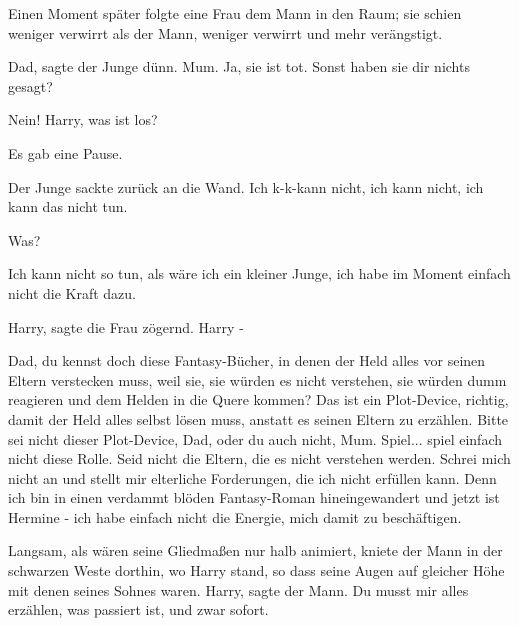 Einen Moment später folgte eine Frau dem Mann in den Raum; sie schien weniger
verwirrt als der Mann, weniger verwirrt und mehr verängstigt.

\glqq Dad\grqq{}, sagte der Junge dünn. \glqq Mum. Ja, sie ist tot. Sonst haben
sie dir nichts gesagt?\grqq{}

\glqq Nein! Harry, was ist los?\grqq{}

Es gab eine Pause.

Der Junge sackte zurück an die Wand. \glqq Ich k-k-kann nicht, ich kann nicht,
ich kann das nicht tun.\grqq{}

\glqq Was?\grqq{}

\glqq Ich kann nicht so tun, als wäre ich ein kleiner Junge, ich habe im Moment
einfach nicht die Kraft dazu.\grqq{}

\glqq Harry\grqq{}, sagte die Frau zögernd. \glqq Harry -\grqq{}

\glqq Dad, du kennst doch diese Fantasy-Bücher, in denen der Held alles vor
seinen Eltern verstecken muss, weil sie, sie würden es nicht verstehen, sie
würden dumm reagieren und dem Helden in die Quere kommen? Das ist ein
Plot-Device, richtig, damit der Held alles selbst lösen muss, anstatt es seinen
Eltern zu erzählen. Bitte sei nicht dieser Plot-Device, Dad, oder du auch nicht,
Mum. Spiel... spiel einfach nicht diese Rolle. Seid nicht die Eltern, die es
nicht verstehen werden. Schrei mich nicht an und stellt mir elterliche
Forderungen, die ich nicht erfüllen kann. Denn ich bin in einen verdammt blöden
Fantasy-Roman hineingewandert und jetzt ist Hermine - ich habe einfach nicht die
Energie, mich damit zu beschäftigen.\grqq{}

Langsam, als wären seine Gliedmaßen nur halb animiert, kniete der Mann in der
schwarzen Weste dorthin, wo Harry stand, so dass seine Augen auf gleicher Höhe
mit denen seines Sohnes waren. \glqq Harry\grqq{}, sagte der Mann. \glqq Du
musst mir alles erzählen, was passiert ist, und zwar sofort.\grqq{}

